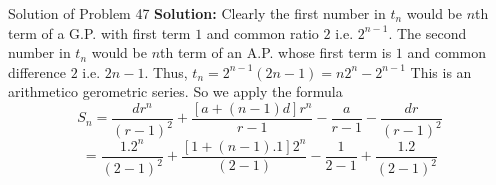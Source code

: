 \documentclass[aspectratio=1610,8pt]{beamer}
\begin{document}
\begin{frame}{Solution of Problem 47}
  \textbf{Solution:} Clearly the first number in $t_n$ would be $n$th term of a G.P. with first term $1$ and common ratio $2$
  i.e. $2^{n - 1}.$ The second number in $t_n$ would be $n$th term of an A.P. whose first term is $1$ and common difference $2$
  i.e. $2n - 1.$ Thus, $t_n = 2^{n - 1}(2n - 1) = n2^n - 2^{n - 1}$
  \vspace{5mm}\linebreak
  This is an arithmetico gerometric series. So we apply the formula
  $$S_n = \frac{dr^n}{(r - 1)^2} + \frac{[a + (n - 1)d]r^n}{r - 1} -\frac{a}{r - 1} - \frac{dr}{(r - 1)^2}$$
  $$= \frac{1.2^n}{(2 - 1)^2} + \frac{[1 + (n - 1).1]2^n}{(2 - 1)} - \frac{1}{2 - 1} + \frac{1.2}{(2 - 1)^2}$$
\end{frame}
\end{document}
